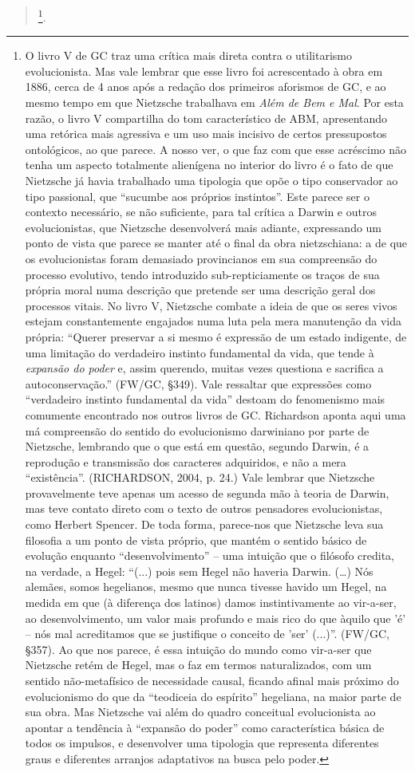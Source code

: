 \documentclass[
	12pt,				%
	openright,			%
	oneside,			%
	a4paper,			%
	english,			%
	french,				%
	spanish,			%
	brazil				%
	]{abntex2}
\begin{document}
\begin{quotation}
\footnote{O livro V de GC traz uma crítica mais direta contra o utilitarismo evolucionista. Mas vale lembrar que esse livro foi acrescentado à obra em 1886, cerca de 4 anos após a redação dos primeiros aforismos de GC, e ao mesmo tempo em que Nietzsche trabalhava em \textit{Além de Bem e Mal}. Por esta razão, o livro V compartilha do tom característico de ABM, apresentando uma retórica mais agressiva e um uso mais incisivo de certos pressupostos ontológicos, ao que parece. A nosso ver, o que faz com que esse acréscimo não tenha um aspecto totalmente alienígena no interior do livro é o fato de que Nietzsche já havia trabalhado uma tipologia que opõe o tipo conservador ao tipo passional, que “sucumbe aos próprios instintos”. Este parece ser o contexto necessário, se não suficiente, para tal crítica a Darwin e outros evolucionistas, que Nietzsche desenvolverá mais adiante, expressando um ponto de vista que parece se manter até o final da obra nietzschiana: a de que os evolucionistas foram demasiado provincianos em sua compreensão do processo evolutivo, tendo introduzido sub-repticiamente os traços de sua própria moral numa descrição que pretende ser uma descrição geral dos processos vitais. No livro V, Nietzsche combate a ideia de que os seres vivos estejam constantemente engajados numa luta pela mera manutenção da vida própria: “Querer preservar a si mesmo é expressão de um estado indigente, de uma limitação do verdadeiro instinto fundamental da vida, que tende à \textit{expansão do poder} e, assim querendo, muitas vezes questiona e sacrifica a autoconservação.” (FW/GC, §349). Vale ressaltar que expressões como “verdadeiro instinto fundamental da vida” destoam do fenomenismo mais comumente encontrado nos outros livros de GC. Richardson aponta aqui uma má compreensão do sentido do evolucionismo darwiniano por parte de Nietzsche, lembrando que o que está em questão, segundo Darwin, é a reprodução e transmissão dos caracteres adquiridos, e não a mera “existência”. (RICHARDSON, 2004, p. 24.) Vale lembrar que Nietzsche provavelmente teve apenas um acesso de segunda mão à teoria de Darwin, mas teve contato direto com o texto de outros pensadores evolucionistas, como Herbert Spencer. De toda forma, parece-nos que Nietzsche leva sua filosofia a um ponto de vista próprio, que mantém o sentido básico de evolução enquanto “desenvolvimento” –  uma intuição que o filósofo credita, na verdade, a Hegel: “(...) pois sem Hegel não haveria Darwin. (…) Nós alemães, somos hegelianos, mesmo que nunca tivesse havido um Hegel, na medida em que (à diferença dos latinos) damos instintivamente ao vir-a-ser, ao desenvolvimento, um valor mais profundo e mais rico do que àquilo que 'é' – nós mal acreditamos que se justifique o conceito de 'ser' (...)”. (FW/GC, §357). Ao que nos parece, é essa intuição do mundo como vir-a-ser que Nietzsche retém de Hegel, mas o faz em termos naturalizados, com um sentido não-metafísico de necessidade causal, ficando afinal mais próximo do evolucionismo do que da “teodiceia do espírito” hegeliana, na maior parte de sua obra. Mas Nietzsche vai além do quadro conceitual evolucionista ao apontar a tendência à “expansão do poder” como característica básica de todos os impulsos, e desenvolver uma tipologia que representa diferentes graus e diferentes arranjos adaptativos na busca pelo poder.}.

\end{quotation}
\end{document}
